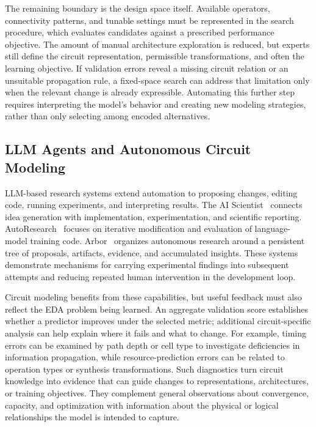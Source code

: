 The remaining boundary is the design space itself. Available operators, connectivity patterns, and tunable settings must be represented in the search procedure, which evaluates candidates against a prescribed performance objective. The amount of manual architecture exploration is reduced, but experts still define the circuit representation, permissible transformations, and often the learning objective. If validation errors reveal a missing circuit relation or an unsuitable propagation rule, a fixed-space search can address that limitation only when the relevant change is already expressible. Automating this further step requires interpreting the model's behavior and creating new modeling strategies, rather than only selecting among encoded alternatives.

\subsection{LLM Agents and Autonomous Circuit Modeling}
\label{sec:llm_agents}

LLM-based research systems extend automation to proposing changes, editing code, running experiments, and interpreting results. The AI Scientist~\cite{lu2024aiscientist} connects idea generation with implementation, experimentation, and scientific reporting. AutoResearch~\cite{karpathy2026autoresearch} focuses on iterative modification and evaluation of language-model training code. Arbor~\cite{jin2026arbor} organizes autonomous research around a persistent tree of proposals, artifacts, evidence, and accumulated insights. These systems demonstrate mechanisms for carrying experimental findings into subsequent attempts and reducing repeated human intervention in the development loop.

Circuit modeling benefits from these capabilities, but useful feedback must also reflect the EDA problem being learned. An aggregate validation score establishes whether a predictor improves under the selected metric; additional circuit-specific analysis can help explain where it fails and what to change. For example, timing errors can be examined by path depth or cell type to investigate deficiencies in information propagation, while resource-prediction errors can be related to operation types or synthesis transformations. Such diagnostics turn circuit knowledge into evidence that can guide changes to representations, architectures, or training objectives. They complement general observations about convergence, capacity, and optimization with information about the physical or logical relationships the model is intended to capture.

